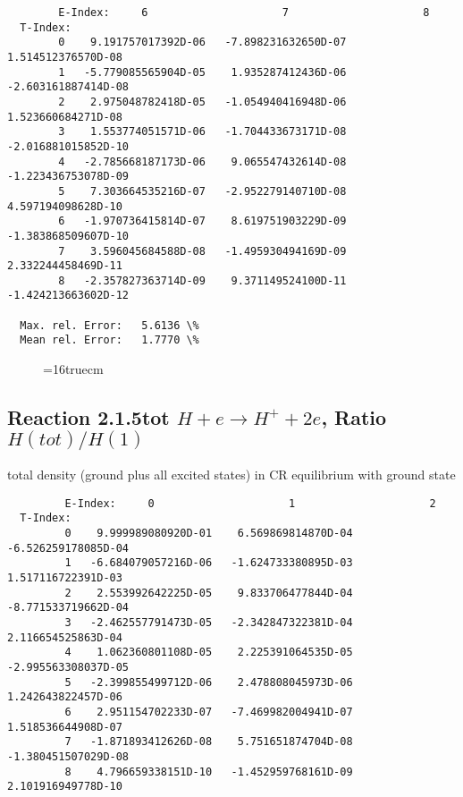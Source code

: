 \documentclass[12pt,dvipdfmx]{article}
\begin{document}
{\begin{small}
\begin{verbatim}
        E-Index:     6                     7                     8
  T-Index:
        0    9.191757017392D-06   -7.898231632650D-07    1.514512376570D-08
        1   -5.779085565904D-05    1.935287412436D-06   -2.603161887414D-08
        2    2.975048782418D-05   -1.054940416948D-06    1.523660684271D-08
        3    1.553774051571D-06   -1.704433673171D-08   -2.016881015852D-10
        4   -2.785668187173D-06    9.065547432614D-08   -1.223436753078D-09
        5    7.303664535216D-07   -2.952279140710D-08    4.597194098628D-10
        6   -1.970736415814D-07    8.619751903229D-09   -1.383868509607D-10
        7    3.596045684588D-08   -1.495930494169D-09    2.332244458469D-11
        8   -2.357827363714D-09    9.371149524100D-11   -1.424213663602D-12

  Max. rel. Error:   5.6136 \%
  Mean rel. Error:   1.7770 \%

\end{verbatim}\end{small}
\begin{figure} \label{2.1.5e}
\epsfxsize=16truecm
\end{figure}

\newpage
\subsection{
Reaction 2.1.5tot $ H + e \rightarrow H^+ + 2e$, Ratio $H(tot)/H(1)$
}

total density (ground plus all excited states) in CR equilibrium with ground state

\begin{small}\begin{verbatim}
         E-Index:     0                     1                     2
  T-Index:
         0    9.999989080920D-01    6.569869814870D-04   -6.526259178085D-04
         1   -6.684079057216D-06   -1.624733380895D-03    1.517116722391D-03
         2    2.553992642225D-05    9.833706477844D-04   -8.771533719662D-04
         3   -2.462557791473D-05   -2.342847322381D-04    2.116654525863D-04
         4    1.062360801108D-05    2.225391064535D-05   -2.995563308037D-05
         5   -2.399855499712D-06    2.478808045973D-06    1.242643822457D-06
         6    2.951154702233D-07   -7.469982004941D-07    1.518536644908D-07
         7   -1.871893412626D-08    5.751651874704D-08   -1.380451507029D-08
         8    4.796659338151D-10   -1.452959768161D-09    2.101916949778D-10


\end{verbatim}
\end{small}}
\end{document}
